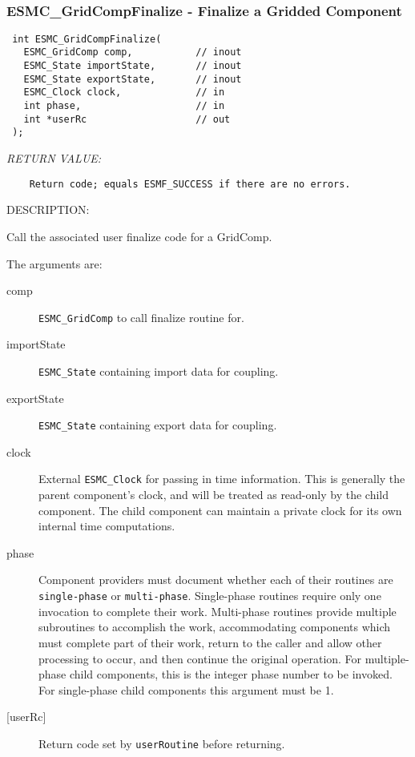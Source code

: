  
\mbox{}\hrulefill\ 
 
\subsubsection [ESMC\_GridCompFinalize] {ESMC\_GridCompFinalize - Finalize a Gridded Component}


  
\begin{verbatim} int ESMC_GridCompFinalize(
   ESMC_GridComp comp,           // inout
   ESMC_State importState,       // inout
   ESMC_State exportState,       // inout 
   ESMC_Clock clock,             // in
   int phase,                    // in
   int *userRc                   // out
 );\end{verbatim}{\em RETURN VALUE:}
\begin{verbatim}    Return code; equals ESMF_SUCCESS if there are no errors.\end{verbatim}
{\sf DESCRIPTION:\\ }


  
    Call the associated user finalize code for a GridComp.
  
    The arguments are:
    \begin{description}
    \item[comp]
      {\tt ESMC\_GridComp} to call finalize routine for.
    \item[importState]
      {\tt ESMC\_State} containing import data for coupling.
    \item[exportState]
      {\tt ESMC\_State} containing export data for coupling.
    \item[clock]
      External {\tt ESMC\_Clock} for passing in time information. This is 
      generally the parent component's clock, and will be treated as read-only
      by the child component. The child component can maintain a private clock
      for its own internal time computations.
    \item[phase]
      Component providers must document whether each of their routines are 
      {\tt single-phase} or {\tt multi-phase}. Single-phase routines require 
      only one invocation to complete their work. Multi-phase routines provide
      multiple subroutines to accomplish the work, accommodating components
      which must complete part of their work, return to the caller and allow 
      other processing to occur, and then continue the original operation. 
      For multiple-phase child components, this is the integer phase number to
      be invoked. For single-phase child components this argument must be 1.
    \item[{[userRc]}]
      Return code set by {\tt userRoutine} before returning.
    \end{description}
   
